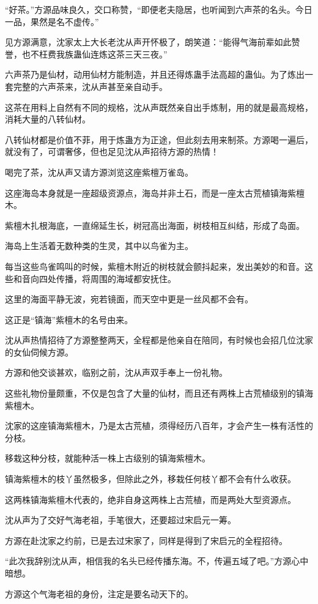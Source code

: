 \begin{this_body}
“好茶。”方源品味良久，交口称赞，“即便老夫隐居，也听闻到六声茶的名头。今日一品，果然是名不虚传。”

见方源满意，沈家太上大长老沈从声开怀极了，朗笑道：“能得气海前辈如此赞誉，也不枉费我族蛊仙连炼这茶三天三夜。”

六声茶乃是仙材，动用仙材方能制造，并且还得炼蛊手法高超的蛊仙。为了炼出一套完整的六声茶来，沈从声甚至亲自动手。

这茶在用料上自然有不同的规格，沈从声既然亲自出手炼制，用的就是最高规格，消耗大量的八转仙材。

八转仙材都是价值不菲，用于炼蛊方为正途，但此刻去用来制茶。方源喝一遍后，就没有了，可谓奢侈，但也足见沈从声招待方源的热情！

喝完了茶，沈从声又请方源浏览这座紫檀万雀岛。

这座海岛本身就是一座超级资源点，海岛并非土石，而是一座太古荒植镇海紫檀木。

紫檀木扎根海底，一直绵延生长，树冠高出海面，树枝相互纠结，形成了岛面。

海岛上生活着无数种类的生灵，其中以鸟雀为主。

每当这些鸟雀鸣叫的时候，紫檀木附近的树枝就会颤抖起来，发出美妙的和音。这些和音向四处传播，将周围的海域都安抚住。

这里的海面平静无波，宛若镜面，而天空中更是一丝风都不会有。

这正是“镇海”紫檀木的名号由来。

沈从声热情招待了方源整整两天，全程都是他亲自在陪同，有时候也会招几位沈家的女仙伺候方源。

方源和他交谈甚欢，临别之前，沈从声双手奉上一份礼物。

这些礼物份量颇重，不仅是包含了大量的仙材，而且还有两株上古荒植级别的镇海紫檀木。

沈家的这座镇海紫檀木，乃是太古荒植，须得经历八百年，才会产生一株有活性的分枝。

移栽这种分枝，就能种活一株上古级别的镇海紫檀木。

镇海紫檀木的枝丫虽然极多，但除此之外，移栽任何枝丫都不会有什么收获。

这两株镇海紫檀木代表的，绝非自身这两株上古荒植，而是两处大型资源点。

沈从声为了交好气海老祖，手笔很大，还要超过宋启元一筹。

方源在赴沈家之约前，已是去过宋家了，同样是得到了宋启元的全程招待。

“此次我辞别沈从声，相信我的名头已经传播东海。不，传遍五域了吧。”方源心中暗想。

方源这个气海老祖的身份，注定是要名动天下的。


\end{this_body}
